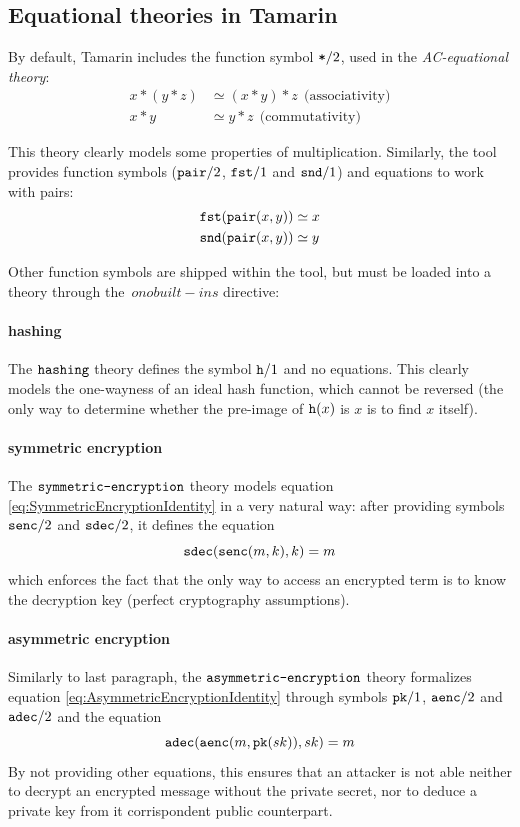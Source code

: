 \documentclass{article}
\newcommand{\mono}[1]{\textrm{\tt #1}}
\begin{document}
\subsection{Equational theories in Tamarin}

By default, Tamarin includes the function symbol $\mono{*}/2$, used in the \textit{AC-equational theory}:
\begin{align*}
    x * (y * z) &\simeq (x * y) * z\ \ \textrm{(associativity)}\\
    x * y &\simeq y * z\ \ \textrm{(commutativity)}
\end{align*}

This theory clearly models some properties of multiplication. Similarly, the tool provides function symbols ($\mono{pair}/2$, $\mono{fst}/1$ and $\mono{snd}/1$) and equations to work with pairs: 
\begin{align*}
    \mono{fst}(\mono{pair}(x,y)) &\simeq x\\
    \mono{snd}(\mono{pair}(x,y)) &\simeq y
\end{align*}

Other function symbols are shipped within the tool, but must be loaded into a theory through the $\,ono{built-ins}$ directive:

\paragraph{hashing}
The $\mono{hashing}$ theory defines the symbol $\mono{h}/1$ and no equations. This clearly models the one-wayness of an ideal hash function, which cannot be reversed (the only way to determine whether the pre-image of $\mono{h}(x)$ is $x$ is to find $x$ itself).

\paragraph{symmetric encryption}
The $\mono{symmetric-encryption}$ theory models equation \ref{eq:SymmetricEncryptionIdentity} in a very natural way: after providing symbols $\mono{senc}/2$ and $\mono{sdec}/2$, it defines the equation
\begin{equation*}
    \mono{sdec}(\mono{senc}(m,k),k) = m
\end{equation*}
which enforces the fact that the only way to access an encrypted term is to know the decryption key (perfect cryptography assumptions).

\paragraph{asymmetric encryption}
Similarly to last paragraph, the $\mono{asymmetric-encryption}$ theory formalizes equation \ref{eq:AsymmetricEncryptionIdentity} through symbols $\mono{pk}/1$, $\mono{aenc}/2$ and $\mono{adec}/2$ and the equation
\begin{equation*}
    \mono{adec}(\mono{aenc}(m, \mono{pk}(sk)), sk) = m
\end{equation*}
By not providing other equations, this ensures that an attacker is not able neither to decrypt an encrypted message without the private secret, nor to deduce a private key from it corrispondent public counterpart.
\end{document}
